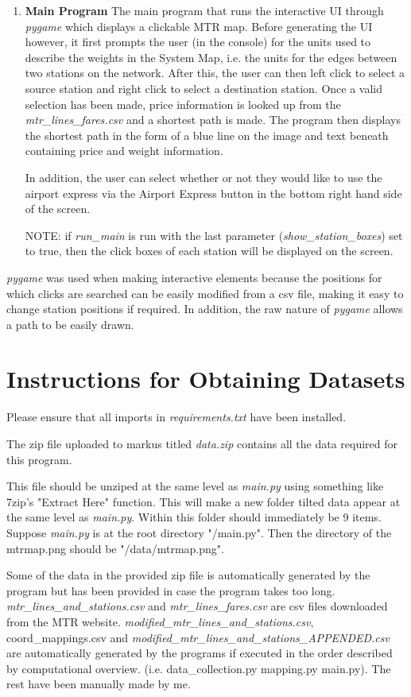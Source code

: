 \documentclass[fontsize=11pt]{article}
\begin{document}
\begin{enumerate}
    \item \textbf{Main Program}
    The main program that runs the interactive UI through \textit{pygame} which displays a clickable MTR map. Before generating the UI however, it first prompts the user (in the console) for the units used to describe the weights in the System Map, i.e. the units for the edges between two stations on the network. After this, the user can then left click to select a source station and right click to select a destination station. Once a valid selection has been made, price information is looked up from the \textit{mtr\_lines\_fares.csv} and a shortest path is made. The program then displays the shortest path in the form of a blue line on the image and text beneath containing price and weight information. 
    
    In addition, the user can select whether or not they would like to use the airport express via the Airport Express button in the bottom right hand side of the screen.
    
    NOTE: if \textit{run\_main} is run with the last parameter (\textit{show\_station\_boxes}) set to true, then the click boxes of each station will be displayed on the screen.
\end{enumerate}

\textit{pygame} was used when making interactive elements because the positions for which clicks are searched can be easily modified from a csv file, making it easy to change station positions if required. In addition, the raw nature of \textit{pygame} allows a path to be easily drawn.

\newpage
\section*{Instructions for Obtaining Datasets}
Please ensure that all imports in \textit{requirements.txt} have been installed. 

The zip file uploaded to markus titled \textit{data.zip} contains all the data required for this program.

This file should be unziped at the same level as \textit{main.py} using something like 7zip's "Extract Here" function. This will make a new folder tilted data appear at the same level as \textit{main.py}. Within this folder should immediately be 9 items. Suppose \textit{main.py} is at the root directory "/main.py". Then the directory of the mtrmap.png should be "/data/mtrmap.png".

Some of the data in the provided zip file is automatically generated by the program but has been provided in case the program takes too long. \textit{mtr\_lines\_and\_stations.csv} and \textit{mtr\_lines\_fares.csv} are csv files downloaded from the MTR website. \textit{modified\_mtr\_lines\_and\_stations.csv}, {coord\_mappings.csv} and \textit{modified\_mtr\_lines\_and\_stations\_APPENDED.csv} are automatically generated by the programs if executed in the order described by computational overview. (i.e. data\_collection.py \to mapping.py \to main.py). The rest have been manually made by me.
\end{document}
